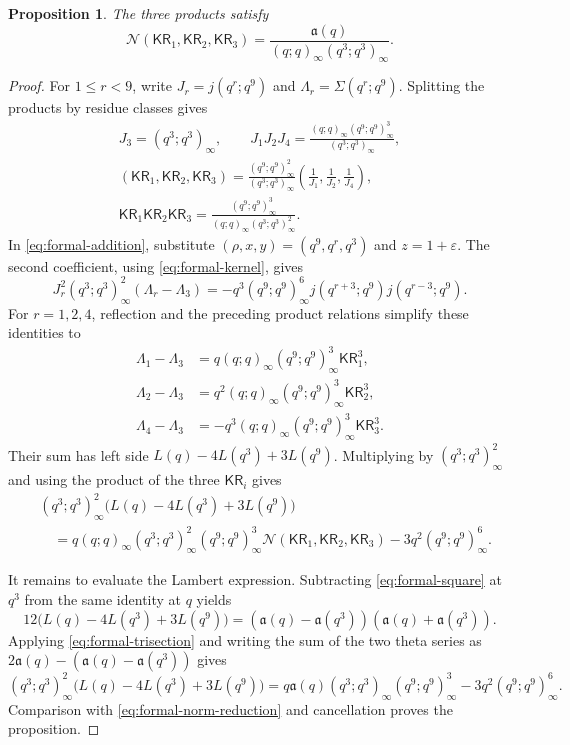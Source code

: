 \documentclass[11pt]{article}
\numberwithin{equation}{section}
\newtheorem{proposition}[theorem]{Proposition}
\theoremstyle{remark}
\newcommand{\KR}{\mathsf{KR}}
\begin{document}
\begin{proposition}\label{prop:mc-product-cubic}
The three products satisfy
\begin{equation}\label{eq:mc-product-norm}
 \mathcal N(\KR_1,\KR_2,\KR_3)
 =\frac{\mathfrak a(q)}{(q;q)_\infty(q^3;q^3)_\infty}.
\end{equation}
\end{proposition}

\begin{proof}
For $1\le r<9$, write $J_r=j(q^r;q^9)$ and $\Lambda_r=\Sigma(q^r;q^9)$. Splitting the products by residue classes gives
\begin{gather*}
 J_3=(q^3;q^3)_\infty,\qquad
 J_1J_2J_4=\frac{(q;q)_\infty(q^9;q^9)_\infty^3}{(q^3;q^3)_\infty},\\
 (\KR_1,\KR_2,\KR_3)
 =\frac{(q^9;q^9)_\infty^2}{(q^3;q^3)_\infty}
 \left(\frac1{J_1},\frac1{J_2},\frac1{J_4}\right),\\
 \KR_1\KR_2\KR_3=\frac{(q^9;q^9)_\infty^3}{(q;q)_\infty(q^3;q^3)_\infty^2}.
\end{gather*}
In \eqref{eq:formal-addition}, substitute $(\rho,x,y)=(q^9,q^r,q^3)$ and $z=1+\varepsilon$. The second coefficient, using \eqref{eq:formal-kernel}, gives
\[
 J_r^2(q^3;q^3)_\infty^2(\Lambda_r-\Lambda_3)
 =-q^3(q^9;q^9)_\infty^6j(q^{r+3};q^9)j(q^{r-3};q^9).
\]
For $r=1,2,4$, reflection and the preceding product relations simplify these identities to
\begin{align*}
 \Lambda_1-\Lambda_3&=q(q;q)_\infty(q^9;q^9)_\infty^3\KR_1^3,\\
 \Lambda_2-\Lambda_3&=q^2(q;q)_\infty(q^9;q^9)_\infty^3\KR_2^3,\\
 \Lambda_4-\Lambda_3&=-q^3(q;q)_\infty(q^9;q^9)_\infty^3\KR_3^3.
\end{align*}
Their sum has left side $L(q)-4L(q^3)+3L(q^9)$. Multiplying by $(q^3;q^3)_\infty^2$ and using the product of the three $\KR_i$ gives
\begin{equation}\label{eq:formal-norm-reduction}
 \begin{aligned}
 &(q^3;q^3)_\infty^2\bigl(L(q)-4L(q^3)+3L(q^9)\bigr)\\
 &\quad=q(q;q)_\infty(q^3;q^3)_\infty^2(q^9;q^9)_\infty^3
 \mathcal N(\KR_1,\KR_2,\KR_3)
 -3q^2(q^9;q^9)_\infty^6.
 \end{aligned}
\end{equation}

It remains to evaluate the Lambert expression. Subtracting \eqref{eq:formal-square} at $q^3$ from the same identity at $q$ yields
\[
 12\bigl(L(q)-4L(q^3)+3L(q^9)\bigr)
 =(\mathfrak a(q)-\mathfrak a(q^3))(\mathfrak a(q)+\mathfrak a(q^3)).
\]
Applying \eqref{eq:formal-trisection} and writing the sum of the two theta series as $2\mathfrak a(q)-(\mathfrak a(q)-\mathfrak a(q^3))$ gives
\[
 (q^3;q^3)_\infty^2\bigl(L(q)-4L(q^3)+3L(q^9)\bigr)
 =q\mathfrak a(q)(q^3;q^3)_\infty(q^9;q^9)_\infty^3
 -3q^2(q^9;q^9)_\infty^6.
\]
Comparison with \eqref{eq:formal-norm-reduction} and cancellation proves the proposition.
\end{proof}
\end{document}
